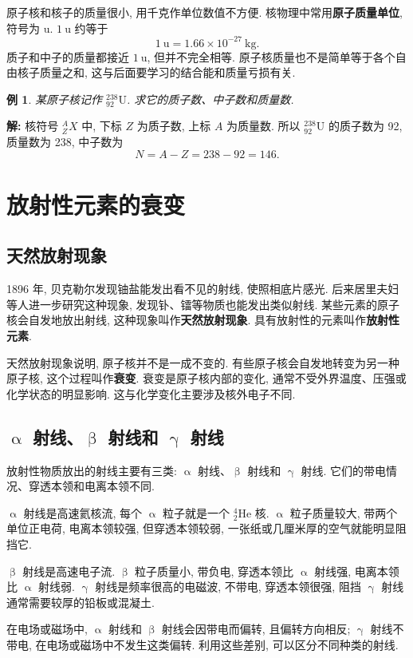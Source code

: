\documentclass[UTF8,openany,fontset=fandol]{ctexbook}
\theoremstyle{chinesetextbook}
\newtheorem{example}{例}[chapter]
\newenvironment{solution}{\par\indent\textbf{解:} \ignorespaces}{\par}
\newcommand{\unit}[1]{\ \mathrm{#1}}
\begin{document}
原子核和核子的质量很小, 用千克作单位数值不方便. 核物理中常用\textbf{原子质量单位}, 符号为 $\mathrm{u}$. $1\unit{u}$ 约等于
\[
1\unit{u}=1.66\times10^{-27}\unit{kg}.
\]
质子和中子的质量都接近 $1\unit{u}$, 但并不完全相等. 原子核质量也不是简单等于各个自由核子质量之和, 这与后面要学习的结合能和质量亏损有关.
\begin{example}
某原子核记作 ${}^{238}_{92}\mathrm{U}$. 求它的质子数、中子数和质量数.
\end{example}
\begin{solution}
核符号 ${}^{A}_{Z}X$ 中, 下标 $Z$ 为质子数, 上标 $A$ 为质量数. 所以 ${}^{238}_{92}\mathrm{U}$ 的质子数为 92, 质量数为 238, 中子数为
\[
N=A-Z=238-92=146.
\]
\end{solution}
\section{放射性元素的衰变}
\subsection{天然放射现象}
1896 年, 贝克勒尔发现铀盐能发出看不见的射线, 使照相底片感光. 后来居里夫妇等人进一步研究这种现象, 发现钋、镭等物质也能发出类似射线. 某些元素的原子核会自发地放出射线, 这种现象叫作\textbf{天然放射现象}. 具有放射性的元素叫作\textbf{放射性元素}.

天然放射现象说明, 原子核并不是一成不变的. 有些原子核会自发地转变为另一种原子核, 这个过程叫作\textbf{衰变}. 衰变是原子核内部的变化, 通常不受外界温度、压强或化学状态的明显影响. 这与化学变化主要涉及核外电子不同.
\subsection{$\upalpha$ 射线、$\upbeta$ 射线和 $\upgamma$ 射线}
放射性物质放出的射线主要有三类: $\upalpha$ 射线、$\upbeta$ 射线和 $\upgamma$ 射线. 它们的带电情况、穿透本领和电离本领不同.

$\upalpha$ 射线是高速氦核流, 每个 $\upalpha$ 粒子就是一个 ${}^{4}_{2}\mathrm{He}$ 核. $\upalpha$ 粒子质量较大, 带两个单位正电荷, 电离本领较强, 但穿透本领较弱, 一张纸或几厘米厚的空气就能明显阻挡它.

$\upbeta$ 射线是高速电子流. $\upbeta$ 粒子质量小, 带负电, 穿透本领比 $\upalpha$ 射线强, 电离本领比 $\upalpha$ 射线弱. $\upgamma$ 射线是频率很高的电磁波, 不带电, 穿透本领很强, 阻挡 $\upgamma$ 射线通常需要较厚的铅板或混凝土.

在电场或磁场中, $\upalpha$ 射线和 $\upbeta$ 射线会因带电而偏转, 且偏转方向相反; $\upgamma$ 射线不带电, 在电场或磁场中不发生这类偏转. 利用这些差别, 可以区分不同种类的射线.
\end{document}
